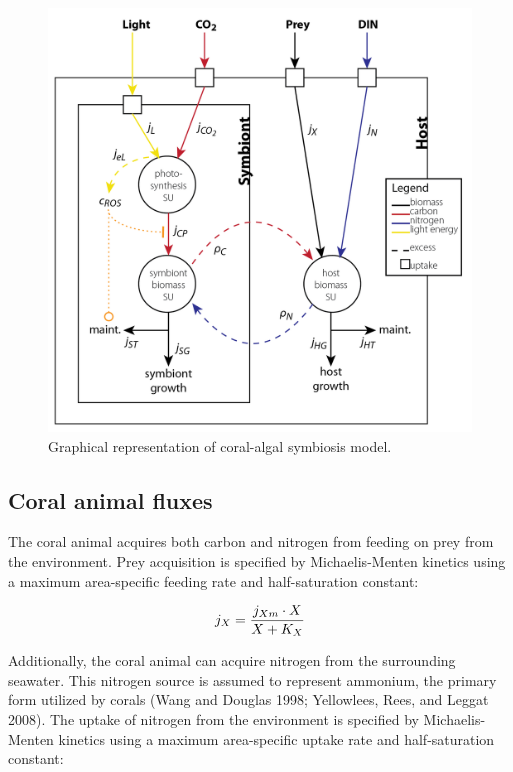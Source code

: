 \documentclass[]{elsarticle} %
\makeatletter
\def\maxwidth{\ifdim\Gin@nat@width>\linewidth\linewidth
\else\Gin@nat@width\fi}
\let\Oldincludegraphics\includegraphics
\renewcommand{\includegraphics}[1]{\Oldincludegraphics[width=\maxwidth]{#1}}
\makeatother
\begin{document}
\begin{figure}[htbp]
\centering
\includegraphics{../img/model.png}
\caption{Graphical representation of coral-algal symbiosis model.}
\end{figure}

\subsection{Coral animal fluxes}\label{coral-animal-fluxes}

The coral animal acquires both carbon and nitrogen from feeding on prey
from the environment. Prey acquisition is specified by Michaelis-Menten
kinetics using a maximum area-specific feeding rate and half-saturation
constant:

\begin{equation} j_X = {{j_{Xm} \cdot X} \over {X + K_X}} \end{equation}

Additionally, the coral animal can acquire nitrogen from the surrounding
seawater. This nitrogen source is assumed to represent ammonium, the
primary form utilized by corals (Wang and Douglas 1998; Yellowlees,
Rees, and Leggat 2008). The uptake of nitrogen from the environment is
specified by Michaelis-Menten kinetics using a maximum area-specific
uptake rate and half-saturation constant:
\end{document}

